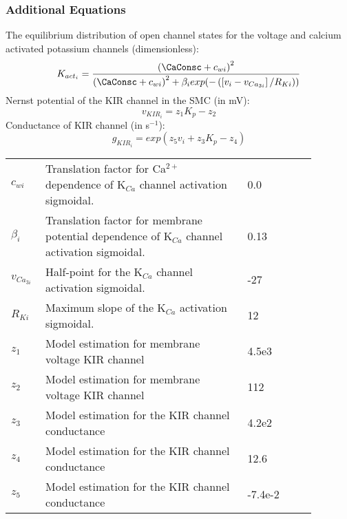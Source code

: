 \subsubsection{Additional Equations}
%
The equilibrium distribution of open channel states for the voltage and calcium activated potassium channels (dimensionless):
\begin{equation} \label{eq:Kacti}
K_{act_{i}}= \frac{  \left( \CaConsc + c_{wi}\right)^{2}}    {\left( \CaConsc + c_{wi} \right)^{2}    + \beta_{i} exp( -\left(   \left[ v_{i}-v_{Ca_{3i}}\right] /R_{Ki}   \right) )      }
\end{equation}
%
Nernst potential of the KIR channel in the SMC (in mV):
\begin{equation}\label{eq:vKIR}
v_{KIR_i} = z_1 K_p-z_2
\end{equation}
%
Conductance of KIR channel (in  s$^{-1} $):
\begin{equation}\label{eq:gKIR}
g_{KIR_i} = exp(z_5v_i +z_3 K_p - z_4)
\end{equation}
%
%
%
\begin{table}[h!]
\centering
\begin{tabular}{| p{0.09\linewidth} | >{\footnotesize} p{0.6\linewidth} | >{\footnotesize} p{0.17\linewidth} | >{\footnotesize} p{0.02\linewidth} |}
\arrayrulecolor{lightgrey}\hline
$c_{wi}$      			& Translation factor for Ca$^{2+}$ dependence of K$_{Ca}$ channel activation sigmoidal.	& 0.0  \uM	&\cite{Koenigsberger2006} \\
$\beta_{i}$     		& Translation factor for membrane potential dependence of K$_{Ca}$ channel activation sigmoidal.	& 0.13 \uMtwee& \cite{Koenigsberger2006} \\
$v_{Ca_{3i}}$   		& Half-point for the K$_{Ca}$ channel activation sigmoidal.			& -27 \mV	&\cite{Koenigsberger2006} \\
$R_{Ki}$      			& Maximum slope of the K$_{Ca}$ activation sigmoidal.				& 12 \mV	&\cite{Koenigsberger2006} \\
$z_{1}$      			& Model estimation for membrane voltage KIR channel				& 4.5e3 \mV	&\cite{LoesEvert}  \\
$z_{2}$      			& Model estimation for membrane voltage KIR channel			& 112 \mV	&\cite{LoesEvert}  \\
$z_{3}$      			& Model estimation for the KIR channel conductance				& 4.2e2 \uMpmVs	&\cite{LoesEvert}  \\
$z_{4}$      			& Model estimation for the KIR channel conductance				& 12.6 \uMpmVs	&\cite{LoesEvert}  \\
$z_{5}$      			& Model estimation for the KIR channel conductance			& -7.4e-2 \uMpmVs	&\cite{LoesEvert}  \\
\hline
\end{tabular}
\label{tab:Addeq}
\end{table}
\\
%
\newpage

